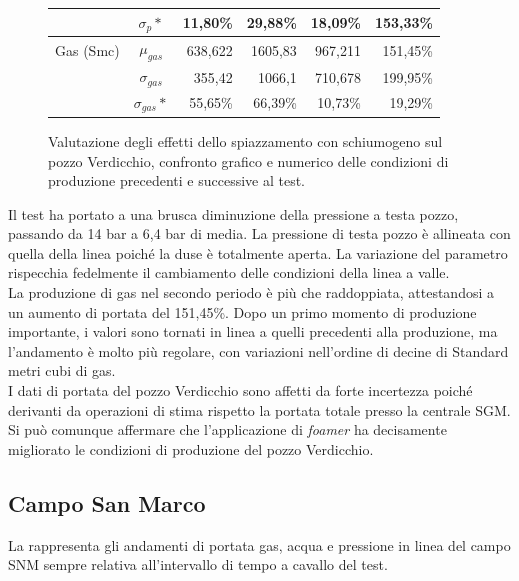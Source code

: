 \begin{figure}[htbp]
{\begin{tabular}{l|crrrr|}
\multicolumn{1}{|l|}{}           & \(\sigma_p\ast\)     & 11,80\%                                & 29,88\%                                 & 18,09\%                                  & 153,33\%                                    \\ \hline
\multicolumn{1}{|l|}{Gas (Smc)}  & \(\mu_{gas}\)        & 638,622                               & 1605,83                                & 967,211                                 & 151,45\%                                    \\
\multicolumn{1}{|l|}{}           & \(\sigma_{gas}\)     & 355,42                                & 1066,1                                 & 710,678                                 & 199,95\%                                    \\
\multicolumn{1}{|l|}{}           & \(\sigma_{gas}\ast\) & 55,65\%                                & 66,39\%                                 & 10,73\%                                  & 19,29\%                                     \\ \hline
\end{tabular}}
\caption{Valutazione degli effetti dello spiazzamento con schiumogeno sul pozzo Verdicchio, confronto grafico e numerico delle condizioni di produzione precedenti e successive al test.}
\label{fig:vrd-test}
\end{figure}

Il test ha portato a una brusca diminuzione della pressione a testa pozzo, passando da 14 bar a 6,4 bar di media. La pressione di testa pozzo è allineata con quella della linea poiché la duse è totalmente aperta. La variazione del parametro rispecchia fedelmente il cambiamento delle condizioni della linea a valle.\\
La produzione di gas nel secondo periodo è più che raddoppiata, attestandosi a un aumento di portata del 151,45\%. Dopo un primo momento di produzione importante, i valori sono tornati in linea a quelli precedenti alla produzione, ma l'andamento è molto più regolare, con variazioni nell'ordine di decine di Standard metri cubi di gas.\\
I dati di portata del pozzo Verdicchio sono affetti da forte incertezza poiché derivanti da operazioni di stima rispetto la portata totale presso la centrale SGM. Si può comunque affermare che l'applicazione di \textit{foamer} ha decisamente migliorato le condizioni di produzione del pozzo Verdicchio.

\subsection{Campo San Marco}
La  rappresenta gli andamenti di portata gas, acqua e pressione in linea del campo SNM sempre relativa all'intervallo di tempo a cavallo del test.

